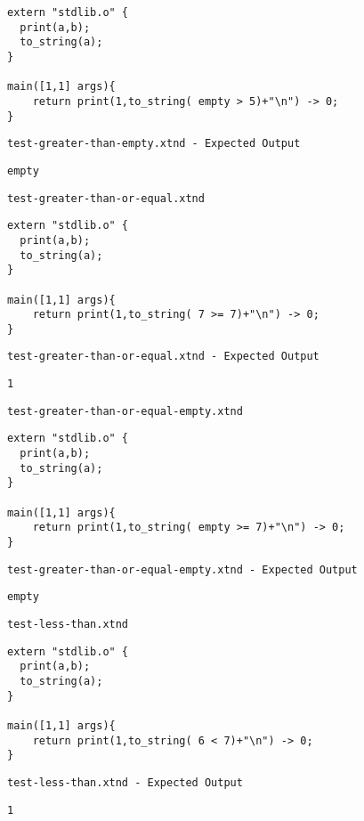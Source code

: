 \begin{lstlisting}
extern "stdlib.o" {
  print(a,b);
  to_string(a);
}

main([1,1] args){
	return print(1,to_string( empty > 5)+"\n") -> 0;
}
\end{lstlisting}


\medskip \noindent \texttt{test-greater-than-empty.xtnd - Expected Output}


\begin{lstlisting}
empty
\end{lstlisting}


\medskip \noindent \texttt{test-greater-than-or-equal.xtnd}


\begin{lstlisting}
extern "stdlib.o" {
  print(a,b);
  to_string(a);
}

main([1,1] args){
	return print(1,to_string( 7 >= 7)+"\n") -> 0;
}
\end{lstlisting}


\medskip \noindent \texttt{test-greater-than-or-equal.xtnd - Expected Output}


\begin{lstlisting}
1
\end{lstlisting}


\medskip \noindent \texttt{test-greater-than-or-equal-empty.xtnd}


\begin{lstlisting}
extern "stdlib.o" {
  print(a,b);
  to_string(a);
}

main([1,1] args){
	return print(1,to_string( empty >= 7)+"\n") -> 0;
}
\end{lstlisting}


\medskip \noindent \texttt{test-greater-than-or-equal-empty.xtnd - Expected Output}


\begin{lstlisting}
empty
\end{lstlisting}


\medskip \noindent \texttt{test-less-than.xtnd}


\begin{lstlisting}
extern "stdlib.o" {
  print(a,b);
  to_string(a);
}

main([1,1] args){
	return print(1,to_string( 6 < 7)+"\n") -> 0;
}
\end{lstlisting}


\medskip \noindent \texttt{test-less-than.xtnd - Expected Output}


\begin{lstlisting}
1
\end{lstlisting}


